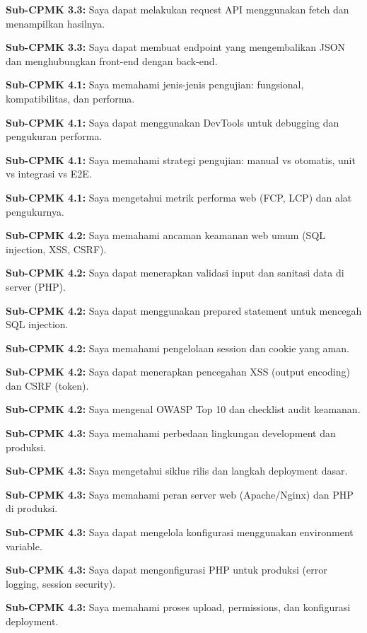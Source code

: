 \documentclass[../main.tex]{subfiles}
\begin{document}
\begin{checklist}
  \item \textbf{Sub-CPMK 3.3:} Saya dapat melakukan request API menggunakan fetch dan menampilkan hasilnya.
  \item \textbf{Sub-CPMK 3.3:} Saya dapat membuat endpoint yang mengembalikan JSON dan menghubungkan front-end dengan back-end.
  \item \textbf{Sub-CPMK 4.1:} Saya memahami jenis-jenis pengujian: fungsional, kompatibilitas, dan performa.
  \item \textbf{Sub-CPMK 4.1:} Saya dapat menggunakan DevTools untuk debugging dan pengukuran performa.
  \item \textbf{Sub-CPMK 4.1:} Saya memahami strategi pengujian: manual vs otomatis, unit vs integrasi vs E2E.
  \item \textbf{Sub-CPMK 4.1:} Saya mengetahui metrik performa web (FCP, LCP) dan alat pengukurnya.
  \item \textbf{Sub-CPMK 4.2:} Saya memahami ancaman keamanan web umum (SQL injection, XSS, CSRF).
  \item \textbf{Sub-CPMK 4.2:} Saya dapat menerapkan validasi input dan sanitasi data di server (PHP).
  \item \textbf{Sub-CPMK 4.2:} Saya dapat menggunakan prepared statement untuk mencegah SQL injection.
  \item \textbf{Sub-CPMK 4.2:} Saya memahami pengelolaan session dan cookie yang aman.
  \item \textbf{Sub-CPMK 4.2:} Saya dapat menerapkan pencegahan XSS (output encoding) dan CSRF (token).
  \item \textbf{Sub-CPMK 4.2:} Saya mengenal OWASP Top 10 dan checklist audit keamanan.
  \item \textbf{Sub-CPMK 4.3:} Saya memahami perbedaan lingkungan development dan produksi.
  \item \textbf{Sub-CPMK 4.3:} Saya mengetahui siklus rilis dan langkah deployment dasar.
  \item \textbf{Sub-CPMK 4.3:} Saya memahami peran server web (Apache/Nginx) dan PHP di produksi.
  \item \textbf{Sub-CPMK 4.3:} Saya dapat mengelola konfigurasi menggunakan environment variable.
  \item \textbf{Sub-CPMK 4.3:} Saya dapat mengonfigurasi PHP untuk produksi (error logging, session security).
  \item \textbf{Sub-CPMK 4.3:} Saya memahami proses upload, permissions, dan konfigurasi deployment.

\end{checklist}
\end{document}

